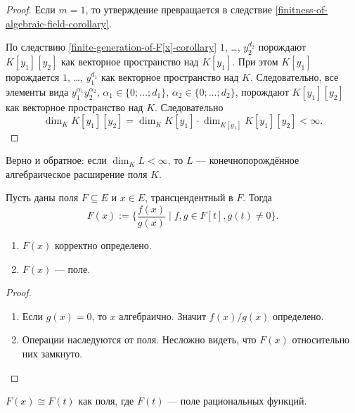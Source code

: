 \documentclass[12pt,a4paper]{article}
\begin{document}
    \begin{proof}
        Если $m = 1$, то утверждение превращается в следствие \ref{finitness-of-algebraic-field-corollary}.

        По следствию \ref{finite-generation-of-F[x]-corollary} $1$, \dots, $y_2^{d_2}$ порождают $K[y_1][y_2]$ как векторное пространство над $K[y_1]$. При этом $K[y_1]$ порождается $1$, \dots, $y_1^{d_1}$ как векторное пространство над $K$. Следовательно, все элементы вида $y_1^{\alpha_1} y_2^{\alpha_2}$, $\alpha_1 \in \{0; \dots; d_1\}$, $\alpha_2 \in \{0; \dots; d_2\}$, порождают $K[y_1][y_2]$ как векторное пространство над $K$. Следовательно
        \[\dim_K K[y_1][y_2] = \dim_K K[y_1] \cdot \dim_{K[y_1]} K[y_1][y_2] < \infty.\]
    \end{proof}

    \begin{exercise}
        Верно и обратное: если $\dim_K L < \infty$, то $L$ --- конечнопорождённое алгебраическое расширение поля $K$.
    \end{exercise}

    \begin{definition}
        Пусть даны поля $F \subseteq E$ и $x \in E$, трансцендентный в $F$. Тогда
        \[F(x) := \{\frac{f(x)}{g(x)} \mid f, g \in F[t], g(t) \neq 0\}.\]
    \end{definition}

    \begin{lemma}
        \begin{enumerate}
            \item $F(x)$ корректно определено.
            \item $F(x)$ --- поле.
        \end{enumerate}
    \end{lemma}

    \begin{proof}
        \begin{enumerate}
            \item Если $g(x) = 0$, то $x$ алгебраично. Значит $f(x)/g(x)$ определено.
            \item Операции наследуются от поля. Несложно видеть, что $F(x)$ относительно них замкнуто.
        \end{enumerate}
    \end{proof}

    \begin{lemma}
        $F(x) \cong F(t)$ как поля, где $F(t)$ --- поле рациональных функций.
    \end{lemma}
\end{document}

